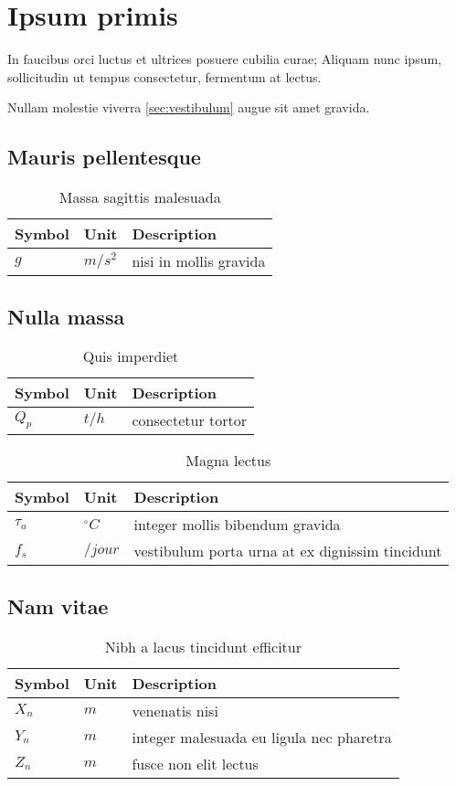 \section{Ipsum primis}

In faucibus orci luctus et ultrices posuere cubilia curae; Aliquam nunc ipsum,
sollicitudin ut tempus consectetur, fermentum at lectus.

Nullam molestie viverra \ref{sec:vestibulum} augue sit amet gravida.

\newenvironment{nomenclature}[1]
{
\begin{table}[hbt]
\caption{#1}
\begin{center}
\begin{tabular}{|l|l|l|}
\hline
\textbf{Symbol} & \textbf{Unit} & \textbf{Description}\\
\hline
}
{
\\\hline
\end{tabular}
\end{center}
\end{table}
}

\subsection{Mauris pellentesque}

\begin{nomenclature}{Massa sagittis malesuada}
$g$     & $m/s^{2}$ & nisi in mollis gravida
\end{nomenclature}

\subsection{Nulla massa}

\begin{nomenclature}{Quis imperdiet}
$Q_{p}$         & $t/h$             & consectetur tortor
\end{nomenclature}

\begin{nomenclature}{Magna lectus}
$\tau_{a}$    	& $^{\circ}C$       & integer mollis bibendum gravida\\
$f_{s}$     	& $/jour$           & vestibulum porta urna at ex dignissim tincidunt
\end{nomenclature}

\subsection{Nam vitae}

\begin{nomenclature}{Nibh a lacus tincidunt efficitur}
$X_n$   & $m$               & venenatis nisi\\
$Y_n$   & $m$               & integer malesuada eu ligula nec pharetra\\
$Z_n$   & $m$               & fusce non elit lectus
\end{nomenclature}
